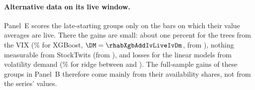 \paragraph{Alternative data on its live window.}  Panel~E scores the late-starting groups only on the bars on which
their value averages are live.  There the gains are small: about one percent for the trees from the VIX
(\rhabXgbAddIvLiveIvPct\% for XGBoost, $\DM = \rhabXgbAddIvLiveIvDm$, from \rhabLiveIvStart), nothing measurable from
StockTwits (from \rhabLiveSentStart), and losses for the linear models from volatility demand
(\rhabRidgeAddVdLiveVdPct\% for ridge between \rhabLiveVdStart{} and \rhabLiveVdEnd).  The full-sample gains of these
groups in Panel~B therefore come mainly from their availability shares, not from the series' values.
